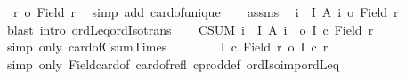 \begin{isabellebody}
\ {\isacharasterisk}{\kern0pt}{\isacharcolon}{\kern0pt}\ {\isachardoublequoteopen}r\ {\isacharequal}{\kern0pt}o\ {\isacharbar}{\kern0pt}Field\ r{\isacharbar}{\kern0pt}{\isachardoublequoteclose}\ \isamarkupfalse%
\ {\isacharparenleft}{\kern0pt}simp\ add{\isacharcolon}{\kern0pt}\ card{\isacharunderscore}{\kern0pt}of{\isacharunderscore}{\kern0pt}unique{\isacharparenright}{\kern0pt}\isanewline
\ \ \isamarkupfalse%
\ assms{\isacharparenleft}{\kern0pt}{}{\isacharparenright}{\kern0pt}\ \isamarkupfalse%
\ {\isachardoublequoteopen}{\isasymforall}i\ {\isasymin}\ I{\isachardot}{\kern0pt}\ {\isacharbar}{\kern0pt}A\ i{\isacharbar}{\kern0pt}\ {\isasymle}o\ {\isacharbar}{\kern0pt}Field\ r{\isacharbar}{\kern0pt}{\isachardoublequoteclose}\ \isamarkupfalse%
\ {\isacharparenleft}{\kern0pt}blast\ intro{\isacharcolon}{\kern0pt}\ ordLeq{\isacharunderscore}{\kern0pt}ordIso{\isacharunderscore}{\kern0pt}trans{\isacharparenright}{\kern0pt}\isanewline
\ \ \isamarkupfalse%
\ {\isachardoublequoteopen}{\isacharparenleft}{\kern0pt}CSUM\ i\ {\isacharcolon}{\kern0pt}\ {\isacharbar}{\kern0pt}I{\isacharbar}{\kern0pt}{\isachardot}{\kern0pt}\ {\isacharbar}{\kern0pt}A\ i{\isacharbar}{\kern0pt}\ {\isacharparenright}{\kern0pt}\ {\isasymle}o\ {\isacharbar}{\kern0pt}I{\isacharbar}{\kern0pt}\ {\isacharasterisk}{\kern0pt}c\ {\isacharbar}{\kern0pt}Field\ r{\isacharbar}{\kern0pt}{\isachardoublequoteclose}\ \isamarkupfalse%
\ {\isacharparenleft}{\kern0pt}simp\ only{\isacharcolon}{\kern0pt}\ card{\isacharunderscore}{\kern0pt}of{\isacharunderscore}{\kern0pt}Csum{\isacharunderscore}{\kern0pt}Times{\isacharparenright}{\kern0pt}\isanewline
\ \ \isamarkupfalse%
\ \isamarkupfalse%
\ {\isacharasterisk}{\kern0pt}\ \isamarkupfalse%
\ {\isachardoublequoteopen}{\isacharbar}{\kern0pt}I{\isacharbar}{\kern0pt}\ {\isacharasterisk}{\kern0pt}c\ {\isacharbar}{\kern0pt}Field\ r{\isacharbar}{\kern0pt}\ {\isasymle}o\ {\isacharbar}{\kern0pt}I{\isacharbar}{\kern0pt}\ {\isacharasterisk}{\kern0pt}c\ r{\isachardoublequoteclose}\isanewline
\ \ \ \ \isamarkupfalse%
\ {\isacharparenleft}{\kern0pt}simp\ only{\isacharcolon}{\kern0pt}\ Field{\isacharunderscore}{\kern0pt}card{\isacharunderscore}{\kern0pt}of\ card{\isacharunderscore}{\kern0pt}of{\isacharunderscore}{\kern0pt}refl\ cprod{\isacharunderscore}{\kern0pt}def\ ordIso{\isacharunderscore}{\kern0pt}imp{\isacharunderscore}{\kern0pt}ordLeq{\isacharparenright}{\kern0pt}\isanewline
\ \ \isamarkupfalse%

\end{isabellebody}
